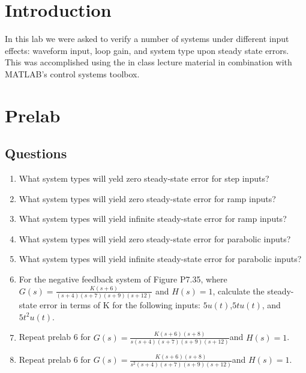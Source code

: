 \documentclass[letterpaper,11pt]{texMemo} %
\begin{document}
\maketitle %


\section*{Introduction}
In this lab we were asked to verify a number of systems under different input effects: waveform input, 
loop gain, and system type upon steady state errors. This was accomplished using the in class lecture material 
in combination with MATLAB's control systems toolbox.

\section*{Prelab}
\subsection*{Questions}
\begin{enumerate}
    \item What system types will yeld zero steady-state error for step inputs?
    \item What system types will yield zero steady-state error for ramp inputs?
    \item What system types will yield infinite steady-state error for ramp inputs?
    \item What system types will yield zero steady-state error for parabolic inputs?
    \item What system types will yield infinite steady-state error for parabolic inputs?
    \item For the negative feedback system of Figure P7.35, where $G(s)= \frac{K(s+6)}{(s+4)(s+7)(s+9)(s+12)}$ and $H(s)=1$, calculate the steady-state error in terms of K for the following inputs: $5u(t)$,$5tu(t)$, and $5t^{2}u(t)$.
    \item Repeat prelab 6 for $G(s)=\frac{K(s+6)(s+8)}{s(s+4)(s+7)(s+9)(s+12)}$and $H(s)=1$.
    \item Repeat prelab 6 for $G(s)=\frac{K(s+6)(s+8)}{s^{2}(s+4)(s+7)(s+9)(s+12)}$and $H(s)=1$.
\end{enumerate}
\end{document}
